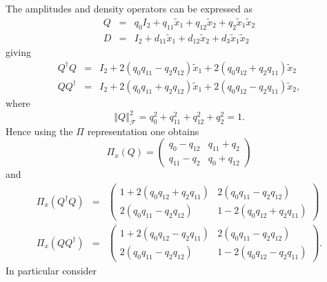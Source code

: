 \documentclass[aps,preprint]{revtex4}
\begin{document}
The amplitudes and density operators can be expressed as 
\begin{eqnarray}
Q &=&q_{0}I_{2}+q_{11}\widetilde{x}_{1}+q_{12}\widetilde{x}_{2}+q_{2}%
\widetilde{x}_{1}\widetilde{x}_{2} \\
D &=&I_{2}+d_{11}\widetilde{x}_{1}+d_{12}\widetilde{x}_{2}+d_{3}\widetilde{x}%
_{1}\widetilde{x}_{2}
\end{eqnarray}%
giving%
\begin{eqnarray}
Q^{\dagger }Q &=&I_{2}+2\left( q_{0}q_{11}-q_{2}q_{12}\right) \widetilde{x}%
_{1}+2\left( q_{0}q_{12}+q_{2}q_{11}\right) \widetilde{x}_{2} \\
QQ^{\dagger } &=&I_{2}+2\left( q_{0}q_{11}+q_{2}q_{12}\right) \widetilde{x}%
_{1}+2\left( q_{0}q_{12}-q_{2}q_{11}\right) \widetilde{x}_{2},
\end{eqnarray}%
where 
\begin{equation}
\left\Vert Q\right\Vert _{\mathcal{F}%
}^{2}=q_{0}^{2}+q_{11}^{2}+q_{12}^{2}+q_{2}^{2}=1.
\end{equation}%
Hence using the $\Pi $ representation one obtains%
\begin{equation}
\Pi _{x}\left( Q\right) =\left( 
\begin{array}{cc}
q_{0}-q_{12} & q_{11}+q_{2} \\ 
q_{11}-q_{2} & q_{0}+q_{12}%
\end{array}%
\right)
\end{equation}%
and%
\begin{eqnarray}
\Pi _{x}\left( Q^{\dagger }Q\right) &=&\left( 
\begin{array}{cc}
1+2\left( q_{0}q_{12}+q_{2}q_{11}\right) & 2\left(
q_{0}q_{11}-q_{2}q_{12}\right) \\ 
2\left( q_{0}q_{11}-q_{2}q_{12}\right) & 1-2\left(
q_{0}q_{12}+q_{2}q_{11}\right)%
\end{array}%
\right) \\
\Pi _{x}\left( QQ^{\dagger }\right) &=&\left( 
\begin{array}{cc}
1+2\left( q_{0}q_{12}-q_{2}q_{11}\right) & 2\left(
q_{0}q_{11}-q_{2}q_{12}\right) \\ 
2\left( q_{0}q_{11}-q_{2}q_{12}\right) & 1-2\left(
q_{0}q_{12}-q_{2}q_{11}\right)%
\end{array}%
\right) .
\end{eqnarray}%
In particular consider
\end{document}
